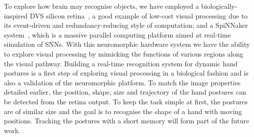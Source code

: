 \documentclass[journal]{journal}
\begin{document}
To explore how brain may recognise objects, we have employed a biologically-inspired DVS silicon retina~\cite{lenero20113}, a good example of low-cost visual processing due to its event-driven and redundancy-reducing style of computation;
and a SpiNNaker system~\cite{furber2014spinnaker}, which is a massive parallel computing platform aimed at real-time simulation of SNNs. 
With this neuromorphic hardware system we have the ability to explore visual processing by mimicking the functions of various regions along the visual pathway. 
Building a real-time recognition system for dynamic hand postures is a first step of exploring visual processing in a biological fashion and is also a validation of the neuromorphic platform.
To match the image properties detailed earlier, the position, shape, size and trajectory of the hand postures can be detected from the retina output.
To keep the task simple at first, the postures are of similar size and the goal is to recognise the shape of a hand with moving positions.
Tracking the postures with a short memory will form part of the future work.
\end{document}

